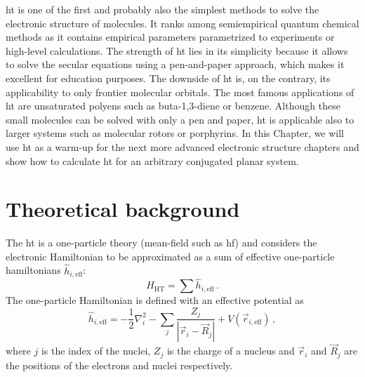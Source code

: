 \acrfull{ht} is one of the first and probably also the simplest methods to solve the electronic structure of molecules. It ranks among semiempirical quantum chemical methods as it contains empirical parameters parametrized to experiments or high-level calculations. The strength of \acrshort{ht} lies in its simplicity because it allows to solve the secular equations using a pen-and-paper approach, which makes it excellent for education purposes. The downside of \acrshort{ht} is, on the contrary, its applicability to only frontier molecular orbitals. The most famous applications of \acrshort{ht} are unsaturated polyens such as buta-1,3-diene or benzene. Although these small molecules can be solved with only a pen and paper, \acrshort{ht} is applicable also to larger systems such as molecular rotors or porphyrins. In this Chapter, we will use \acrshort{ht} as a warm-up for the next more advanced electronic structure chapters and show how to calculate \acrshort{ht} for an arbitrary conjugated planar system.

\section{Theoretical background}

The \acrshort{ht} is a one-particle theory (mean-field such as \acrlong{hf}) and considers the electronic Hamiltonian to be approximated as a sum of effective one-particle hamiltonians $\hat{h}_{i, \mathrm{eff}}$:
\begin{equation}
\hat{H}_{\mathrm{HT}}= \sum \hat{h}_{i, \mathrm{eff}} \, .
\label{eq:huckel1}
\end{equation}
The one-particle Hamiltonian is defined with an effective potential as
\begin{equation}
\hat{h}_{i, \mathrm{eff}}  = -\frac{1}{2}\nabla_i^2  - \sum_j \frac{Z_j}{|\Vec{r}_i - \Vec{R}_j|} + V(\Vec{r}_{i, \mathrm{eff}})  \, ,
\label{eq:huckel2}
\end{equation}
where $j$ is the index of the nuclei, $Z_j$ is the charge of a nucleus and $\Vec{r}_i$ and $\Vec{R}_j$ are the positions of the electrons and nuclei respectively.

